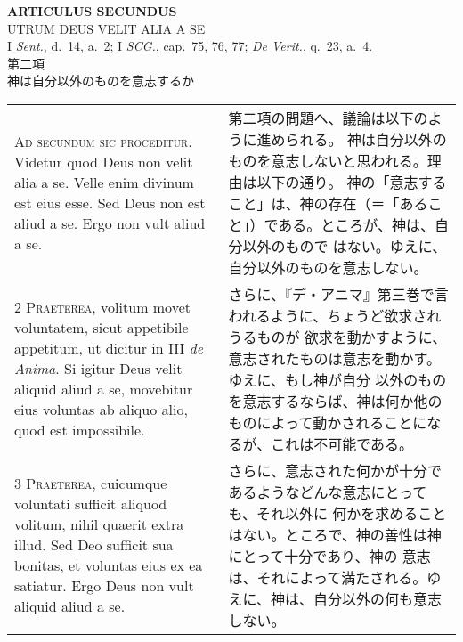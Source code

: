 \documentclass[10pt]{jsarticle} %
\begin{document}
\newpage





\begin{center}
 {\Large {\bf ARTICULUS SECUNDUS}}\\
 {\large UTRUM DEUS VELIT ALIA A SE}\\
 {\footnotesize I {\itshape Sent.}, d.~14, a.~2; I {\itshape SCG.},
 cap.~75, 76, 77; {\itshape De Verit.}, q.~23, a.~4.}\\
 {\Large 第二項\\神は自分以外のものを意志するか}
\end{center}

\begin{longtable}{p{21em}p{21em}}
{\huge A}{\scshape d secundum sic proceditur}. Videtur quod Deus non
 velit alia a se. Velle enim divinum est eius esse. Sed Deus non est
 aliud a se. Ergo non vult aliud a se.


&

第二項の問題へ、議論は以下のように進められる。
神は自分以外のものを意志しないと思われる。理由は以下の通り。
神の「意志すること」は、神の存在（＝「あること」）である。ところが、神は、自分以外のもので
 はない。ゆえに、自分以外のものを意志しない。


\\





{\scshape 2 Praeterea}, volitum movet voluntatem, sicut appetibile
 appetitum, ut dicitur in III {\itshape de Anima}. Si igitur Deus velit aliquid
 aliud a se, movebitur eius voluntas ab aliquo alio, quod est
 impossibile.


&

さらに、『デ・アニマ』第三巻で言われるように、ちょうど欲求されうるものが
 欲求を動かすように、意志されたものは意志を動かす。ゆえに、もし神が自分
 以外のものを意志するならば、神は何か他のものによって動かされることにな
 るが、これは不可能である。

\\





{\scshape 3 Praeterea}, cuicumque voluntati sufficit aliquod volitum,
 nihil quaerit extra illud. Sed Deo sufficit sua bonitas, et voluntas
 eius ex ea satiatur. Ergo Deus non vult aliquid aliud a se.


&


さらに、意志された何かが十分であるようなどんな意志にとっても、それ以外に
 何かを求めることはない。ところで、神の善性は神にとって十分であり、神の
 意志は、それによって満たされる。ゆえに、神は、自分以外の何も意志しない。


\end{longtable}
\end{document}
